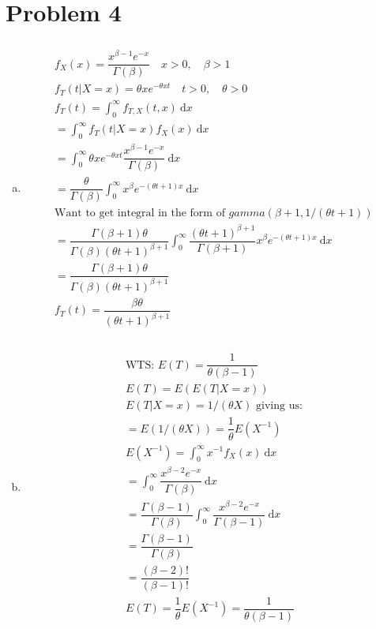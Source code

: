 \documentclass{article}
\newcommand{\dx}{\mathrm{d}x}
\newcommand{\B}{\beta}
\begin{document}
\begin{flushleft}
\begin{enumerate}[(a)]
\end{enumerate}

	\section*{Problem 4}
	
\begin{enumerate}[(a)]
	
	\item 	
\begin{multline*}\\
f_X(x)=\dfrac{x^{\B-1}e^{-x}}{\Gamma(\B)} \quad x>0, \quad \B>1\\
f_T(t|X=x)=\theta xe^{-\theta xt} \quad t>0, \quad \theta>0\\
f_T(t)=\int_{0}^{\infty}f_{T,X}(t,x) \ \dx\\
=\int_{0}^{\infty}f_{T}(t|X=x)f_X(x) \ \dx\\
=\int_{0}^{\infty}\theta xe^{-\theta xt}\dfrac{x^{\B-1}e^{-x}}{\Gamma(\B)} \ \dx\\
=\dfrac{\theta}{\Gamma(\B)}\int_{0}^{\infty} x^{\B}e^{-(\theta t+1)x} \ \dx\\
\text{Want to get integral in the form of } gamma(\B+1,1/(\theta t+1))\\
=\dfrac{\Gamma(\B+1)\theta}{\Gamma(\B)(\theta t+1)^{\B+1}}\int_{0}^{\infty}\dfrac{(\theta t+1)^{\B+1}}{\Gamma(\B+1)} x^{\B}e^{-(\theta t+1)x} \ \dx\\
=\dfrac{\Gamma(\B+1)\theta}{\Gamma(\B)(\theta t+1)^{\B+1}}\\
f_T(t)=\dfrac{\B\theta}{(\theta t+1)^{\B+1}}\\
\end{multline*}
	
	\item 
\begin{multline*}\\
\text{WTS: } E(T)=\dfrac{1}{\theta(\B-1)}\\
E(T)=E(E(T|X=x))\\
E(T|X=x)=1/(\theta X) \text{ giving us:}\\
=E(1/(\theta X))=\dfrac{1}{\theta}E(X^{-1})\\
E(X^{-1})=\int_{0}^{\infty} x^{-1}f_X(x)\ \dx\\
=\int_{0}^{\infty} \dfrac{x^{\B-2}e^{-x}}{\Gamma(\B)} \ \dx\\
=\dfrac{\Gamma(\B-1)}{\Gamma(\B)}\int_{0}^{\infty} \dfrac{x^{\B-2}e^{-x}}{\Gamma(\B-1)} \ \dx\\
=\dfrac{\Gamma(\B-1)}{\Gamma(\B)}\\
=\dfrac{(\B-2)!}{(\B-1)!}\\
E(T)=\dfrac{1}{\theta}E(X^{-1})=\dfrac{1}{\theta(\B-1)}\\
\end{multline*}


\end{enumerate}
\end{flushleft}
\end{document}
